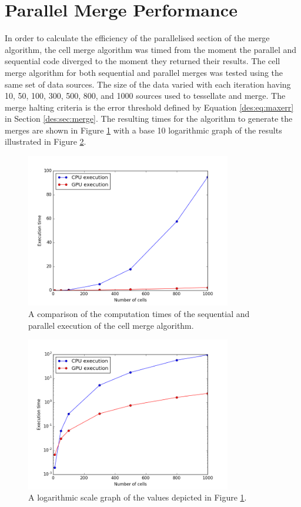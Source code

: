 \section{Parallel Merge Performance}
In order to calculate the efficiency of the parallelised section of the merge algorithm, the cell merge algorithm was timed from the moment the parallel and sequential code diverged to the moment they returned their results. The cell merge algorithm for both sequential and parallel merges was tested using the same set of data sources. The size of the data varied with each iteration having 10, 50, 100, 300, 500, 800, and 1000 sources used to tessellate and merge. The merge halting criteria is the error threshold defined by Equation \ref{des:eq:maxerr} in Section \ref{des:sec:merge}. The resulting times for the algorithm to generate the merges are shown in Figure \ref{res:fig:cvg} with a base 10 logarithmic graph of the results illustrated in Figure \ref{res:fig:cvg_1og}.
\begin{figure}[H]
\centering
\includegraphics[width=0.8\textwidth]{Images/result_cvg.png}
\caption{A comparison of the computation times of the sequential and parallel execution of the cell merge algorithm.}
\label{res:fig:cvg}
\end{figure}
\begin{figure}[H]
\centering
\includegraphics[width=0.8\textwidth]{Images/result_cvg_log.png}
\caption{A logarithmic scale graph of the values depicted in Figure \ref{res:fig:cvg}.}
\label{res:fig:cvg_1og}
\end{figure}
